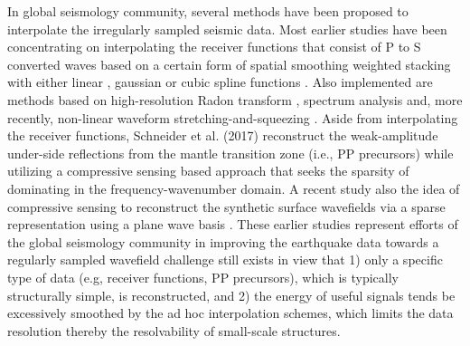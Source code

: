 In global seismology community, several methods have been proposed to interpolate the irregularly sampled seismic data. Most earlier studies have been concentrating on interpolating the receiver functions \cite[]{langston1977effect} that consist of P to S converted waves based on a certain form of spatial smoothing  weighted stacking with either linear \cite[]{chengping2015}, gaussian \cite[]{neal1999imaging, song2017moho} or cubic spline functions \cite[]{sheldrake2002regional, zhang2014receiver}. Also implemented are methods based on high-resolution Radon transform \cite[]{wilson2007teleseismic},  spectrum analysis \cite[]{gu2015sharp, dokht2016singular} and, more recently, non-linear waveform stretching-and-squeezing \cite[]{hu2018wavefield}.  Aside from interpolating the receiver functions, Schneider et al. (2017) \cite[]{schneider2017improvement} reconstruct the weak-amplitude under-side reflections from the mantle transition zone (i.e., PP precursors) while utilizing a compressive sensing based approach that seeks the sparsity of dominating  in the frequency-wavenumber domain.  A recent study also  the idea of compressive sensing to reconstruct the synthetic surface wavefields via a sparse representation using a plane wave basis \cite[]{zhan2018application}.  These earlier studies represent  efforts of the global seismology community in improving the earthquake data towards a regularly sampled wavefield challenge still exists in view that 1) only a specific type of data (e.g, receiver functions, PP precursors), which is typically structurally simple, is reconstructed, and 2) the energy of useful signals tends  be excessively smoothed by the ad hoc interpolation schemes, which limits the data resolution thereby the resolvability of small-scale structures.  

